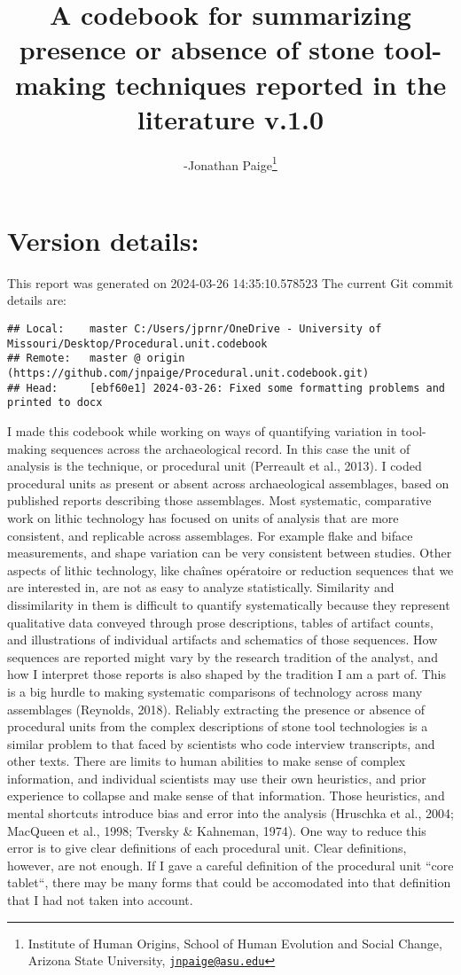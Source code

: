 \documentclass[
]{article}
\title{A codebook for summarizing presence or absence of stone
tool-making techniques reported in the literature v.1.0}
\author{-Jonathan Paige\footnote{Institute of Human Origins, School of
  Human Evolution and Social Change, Arizona State University,
  \href{mailto:jnpaige@asu.edu}{\nolinkurl{jnpaige@asu.edu}}}}
\date{}
\begin{document}
\maketitle

{
\setcounter{tocdepth}{3}
\tableofcontents
}
\hypertarget{version-details}{%
\section{Version details:}\label{version-details}}

This report was generated on 2024-03-26 14:35:10.578523 The current Git
commit details are:

\begin{verbatim}
## Local:    master C:/Users/jprnr/OneDrive - University of Missouri/Desktop/Procedural.unit.codebook
## Remote:   master @ origin (https://github.com/jnpaige/Procedural.unit.codebook.git)
## Head:     [ebf60e1] 2024-03-26: Fixed some formatting problems and printed to docx
\end{verbatim}

I made this codebook while working on ways of quantifying variation in
tool-making sequences across the archaeological record. In this case the
unit of analysis is the technique, or procedural unit (Perreault et al.,
2013). I coded procedural units as present or absent across
archaeological assemblages, based on published reports describing those
assemblages. Most systematic, comparative work on lithic technology has
focused on units of analysis that are more consistent, and replicable
across assemblages. For example flake and biface measurements, and shape
variation can be very consistent between studies. Other aspects of
lithic technology, like chaînes opératoire or reduction sequences that
we are interested in, are not as easy to analyze statistically.
Similarity and dissimilarity in them is difficult to quantify
systematically because they represent qualitative data conveyed through
prose descriptions, tables of artifact counts, and illustrations of
individual artifacts and schematics of those sequences. How sequences
are reported might vary by the research tradition of the analyst, and
how I interpret those reports is also shaped by the tradition I am a
part of. This is a big hurdle to making systematic comparisons of
technology across many assemblages (Reynolds, 2018). Reliably extracting
the presence or absence of procedural units from the complex
descriptions of stone tool technologies is a similar problem to that
faced by scientists who code interview transcripts, and other texts.
There are limits to human abilities to make sense of complex
information, and individual scientists may use their own heuristics, and
prior experience to collapse and make sense of that information. Those
heuristics, and mental shortcuts introduce bias and error into the
analysis (Hruschka et al., 2004; MacQueen et al., 1998; Tversky \&
Kahneman, 1974). One way to reduce this error is to give clear
definitions of each procedural unit. Clear definitions, however, are not
enough. If I gave a careful definition of the procedural unit ``core
tablet``, there may be many forms that could be accomodated into that
definition that I had not taken into account.
\end{document}
